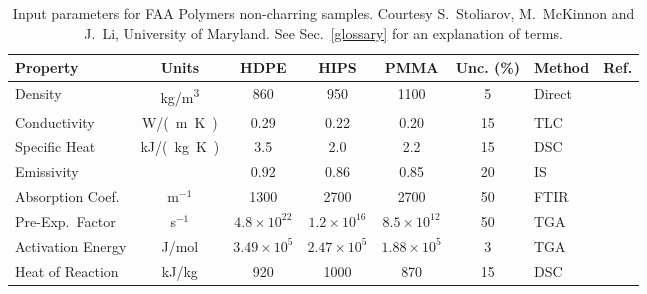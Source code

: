 \begin{table}[h!]
\caption[FAA non-charring polymer properties]{Input parameters for FAA Polymers non-charring samples. Courtesy S.~Stoliarov, M.~McKinnon and J.~Li, University of Maryland.
See Sec.~\ref{glossary} for an explanation of terms.}
\begin{center}
\begin{tabular}{|l|c|c|c|c|c|l|l|}
\hline
Property                    & Units         & HDPE                  & HIPS                  & PMMA                  & Unc. (\%) & Method                &  Ref.                         \\ \hline \hline
Density                     & \unit{kg/m^3}      & 860                   & 950                   & 1100                  & 5         & Direct                &  \cite{Stoliarov:CF2009}      \\ \hline
Conductivity                & \unit{W/(m.K)}& 0.29                  & 0.22                  & 0.20                  & 15        & TLC                   &  \cite{Stoliarov:CF2009}      \\ \hline
Specific Heat               & \unit{kJ/(kg.K)}       & 3.5                   & 2.0                   & 2.2                   & 15        & DSC                   &  \cite{Stoliarov:PDS2008}     \\ \hline
Emissivity                  &               & 0.92                  & 0.86                  & 0.85                  & 20        & IS                    &  \cite{Hallman:PES1974}       \\ \hline
Absorption Coef.            & m$^{-1}$      & 1300                  & 2700                  & 2700                  & 50        & FTIR                  &  \cite{Tsilingiris:ECM2003}   \\ \hline
Pre-Exp.~Factor             & s$^{-1}$      & $4.8 \times 10^{22}$  & $1.2 \times 10^{16}$  & $8.5 \times 10^{12}$  & 50        & TGA                   &  \cite{Stoliarov:CF2009}      \\ \hline
Activation Energy           & J/mol       & $3.49 \times 10^{5}$  & $2.47 \times 10^{5}$  & $1.88 \times 10^{5}$  & 3         & TGA                   &  \cite{Stoliarov:CF2009}      \\ \hline
Heat of Reaction            & kJ/kg         & 920                   & 1000                  & 870                   & 15        & DSC                   &  \cite{Stoliarov:PDS2008}     \\ \hline
\end{tabular}
\end{center}
\label{FAA_Properties}
\end{table}



